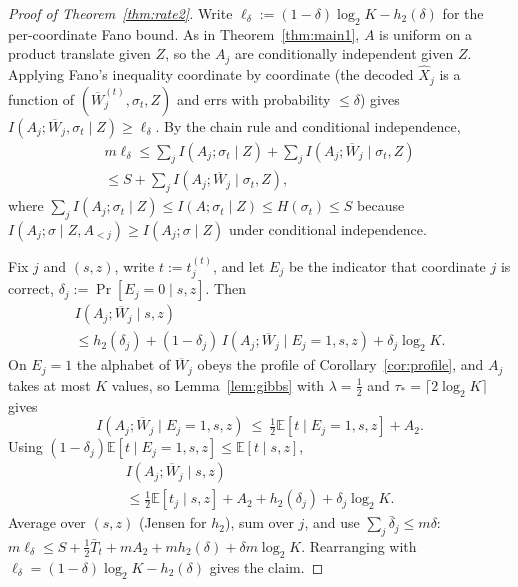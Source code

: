 \documentclass[aps,prx,twocolumn,superscriptaddress,nofootinbib,longbibliography]{revtex4-2}
\theoremstyle{plain}
\theoremstyle{definition}
\theoremstyle{remark}
\newcommand{\E}{\mathbb{E}}
\begin{document}
\begin{proof}[Proof of Theorem~\ref{thm:rate2}]
Write $\ell_\delta:=(1-\delta)\log_2K-h_2(\delta)$ for the per-coordinate Fano bound. As in Theorem~\ref{thm:main1}, $A$ is uniform on a product translate given $Z$, so the $A_j$ are conditionally independent given $Z$. Applying Fano's inequality coordinate by coordinate (the decoded $\hat X_j$ is a function of $(\overline W^{(t)}_j,\sigma_t,Z)$ and errs with probability $\le\delta$) gives $I(A_j;\overline W_j,\sigma_t\mid Z)\ge\ell_\delta$. By the chain rule and conditional independence,
\begin{multline}\label{eq:chain}
m\ell_\delta\le\sum_jI(A_j;\sigma_t\mid Z)+\sum_jI(A_j;\overline W_j\mid\sigma_t,Z)\\
\le S+\sum_jI(A_j;\overline W_j\mid\sigma_t,Z),
\end{multline}
where $\sum_jI(A_j;\sigma_t\mid Z)\le I(A;\sigma_t\mid Z)\le H(\sigma_t)\le S$ because $I(A_j;\sigma\mid Z,A_{<j})\ge I(A_j;\sigma\mid Z)$ under conditional independence.

Fix $j$ and $(s,z)$, write $t:=t^{(t)}_j$, and let $E_j$ be the indicator that coordinate $j$ is correct, $\delta_j:=\Pr[E_j=0\mid s,z]$. Then
\begin{multline}
I(A_j;\overline W_j\mid s,z)\\
\le h_2(\delta_j)+(1-\delta_j)\,I(A_j;\overline W_j\mid E_j=1,s,z)+\delta_j\log_2K.
\end{multline}
On $E_j=1$ the alphabet of $\overline W_j$ obeys the profile of Corollary~\ref{cor:profile}, and $A_j$ takes at most $K$ values, so Lemma~\ref{lem:gibbs} with $\lambda=\tfrac12$ and $\tau_*=\lceil2\log_2K\rceil$ gives
\begin{equation}
I(A_j;\overline W_j\mid E_j=1,s,z)\ \le\ \tfrac12\E[t\mid E_j=1,s,z]+A_2 .
\end{equation}
Using $(1-\delta_j)\E[t\mid E_j=1,s,z]\le\E[t\mid s,z]$,
\begin{multline}
I(A_j;\overline W_j\mid s,z)\\
\le\tfrac12\E[t_j\mid s,z]+A_2+h_2(\delta_j)+\delta_j\log_2K.
\end{multline}
Average over $(s,z)$ (Jensen for $h_2$), sum over $j$, and use $\sum_j\bar\delta_j\le m\delta$: $m\ell_\delta\le S+\tfrac12\bar T_t+mA_2+mh_2(\delta)+\delta m\log_2K$. Rearranging with $\ell_\delta=(1-\delta)\log_2K-h_2(\delta)$ gives the claim.
\end{proof}
\end{document}
